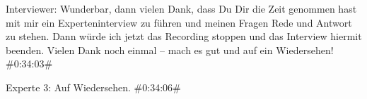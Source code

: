 Interviewer:
Wunderbar, dann vielen Dank, dass Du Dir die Zeit genommen hast mit mir ein Experteninterview zu führen und meinen Fragen Rede und Antwort zu stehen. Dann würde ich jetzt das Recording stoppen und das Interview hiermit beenden. Vielen Dank noch einmal – mach es gut und auf ein Wiedersehen!
\#0:34:03\#

Experte 3:
Auf Wiedersehen.
\#0:34:06\#













\newpage


